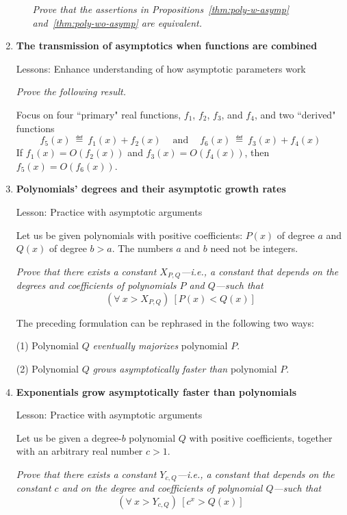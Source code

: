 \begin{enumerate}
\begin{enumerate}
{\em Prove that the assertions in Propositions~\ref{thm:poly-w-asymp} and~\ref{thm:poly-wo-asymp} are equivalent.}
  \end{enumerate}

\medskip\item
{\bf The transmission of asymptotics when functions are combined}

{\sc Lessons:} Enhance understanding of how asymptotic parameters work

\smallskip

{\em Prove the following result.}

\begin{prop}
Focus on four ``primary" real functions, $f_1$, $f_2$, $f_3$, and $f_4$, and two ``derived" functions
\[ f_5(x) \ \eqdef \ f_1(x) + f_2(x) \ \ \ \ \mbox{ and } \ \ \ \ f_6(x) \ \eqdef \ f_3(x) + f_4(x) \]  
If $f_1(x) = O(f_2(x))$ and $f_3(x) = O(f_4(x))$, then $f_5(x) = O(f_6(x))$.
\end{prop}

\medskip\item
{\bf Polynomials' degrees and their asymptotic growth rates}

{\sc Lesson:} Practice with asymptotic arguments

\smallskip

Let us be given polynomials with positive coefficients: $P(x)$ of degree $a$ and $Q(x)$ of degree $b > a$.  The numbers $a$ and $b$ need not be integers. 

\smallskip

{\em Prove that there exists a constant $X_{P,Q}$---i.e., a constant that depends on the degrees and coefficients of polynomials $P$ and $Q$---such that}
\[ (\forall \ x > X_{P,Q}) \ \left[ P(x) < Q(x) \right] \]

\smallskip

The preceding formulation can be rephrased in the following two ways:

(1) Polynomial $Q$ {\em eventually majorizes} polynomial $P$.

(2) Polynomial $Q$ {\em grows asymptotically faster than} polynomial $P$.

\medskip\item
{\bf Exponentials grow asymptotically faster than polynomials}

{\sc Lesson:} Practice with asymptotic arguments

\smallskip

Let us be given a degree-$b$ polynomial $Q$ with positive coefficients, together with an arbitrary real number $c > 1$.

\smallskip

{\em Prove that there exists a constant $Y_{c,Q}$---i.e., a constant that depends on the constant $c$ and on the degree and coefficients of polynomial $Q$---such that}
\[ (\forall \ x > Y_{c,Q}) \ \left[ c^x > Q(x) \right] \]
\end{enumerate}

